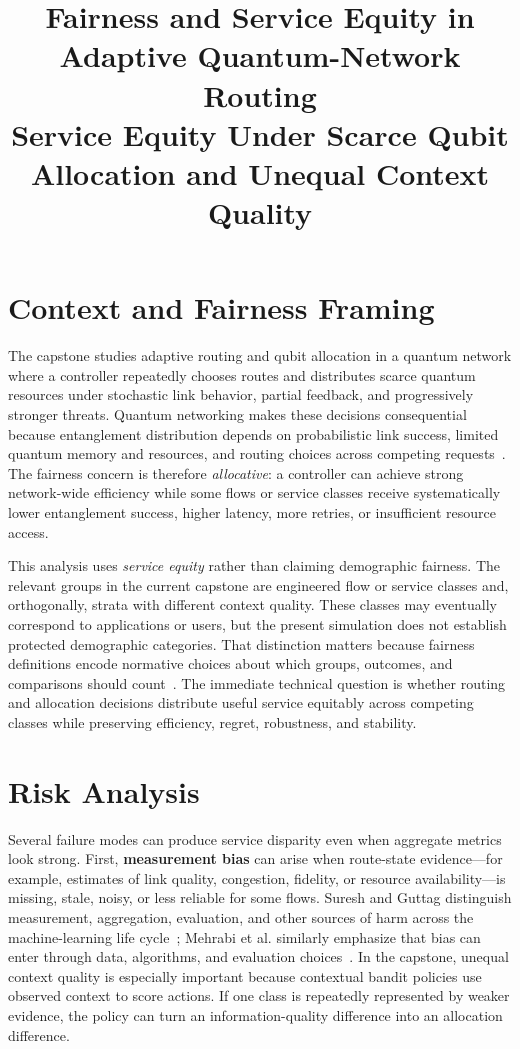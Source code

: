 \documentclass[conference]{IEEEtran}
\title{\textbf{Fairness and Service Equity in Adaptive Quantum-Network Routing}\\
\large Service Equity Under Scarce Qubit Allocation and Unequal Context Quality}
\author{\IEEEauthorblockN{Piter Z. Garcia Bautista}
\IEEEauthorblockA{DSCI 602 -- Applied Data Science II, Rochester Institute of Technology\\
Capstone: \textit{Fairness-Aware Adaptive Routing for Quantum Networks}\\
Primary Focus Area: \textbf{Fairness}}}
\begin{document}
\maketitle

\section{Context and Fairness Framing}

The capstone studies adaptive routing and qubit allocation in a quantum network where a controller repeatedly chooses routes and distributes scarce quantum resources under stochastic link behavior, partial feedback, and progressively stronger threats. Quantum networking makes these decisions consequential because entanglement distribution depends on probabilistic link success, limited quantum memory and resources, and routing choices across competing requests~\cite{wehner2018quantum,pant2019routing}. The fairness concern is therefore \emph{allocative}: a controller can achieve strong network-wide efficiency while some flows or service classes receive systematically lower entanglement success, higher latency, more retries, or insufficient resource access.

This analysis uses \emph{service equity} rather than claiming demographic fairness. The relevant groups in the current capstone are engineered flow or service classes and, orthogonally, strata with different context quality. These classes may eventually correspond to applications or users, but the present simulation does not establish protected demographic categories. That distinction matters because fairness definitions encode normative choices about which groups, outcomes, and comparisons should count~\cite{barocas2023fairness}. The immediate technical question is whether routing and allocation decisions distribute useful service equitably across competing classes while preserving efficiency, regret, robustness, and stability.

\section{Risk Analysis}

Several failure modes can produce service disparity even when aggregate metrics look strong. First, \textbf{measurement bias} can arise when route-state evidence---for example, estimates of link quality, congestion, fidelity, or resource availability---is missing, stale, noisy, or less reliable for some flows. Suresh and Guttag distinguish measurement, aggregation, evaluation, and other sources of harm across the machine-learning life cycle~\cite{suresh2021harm}; Mehrabi et al. similarly emphasize that bias can enter through data, algorithms, and evaluation choices~\cite{mehrabi2021survey}. In the capstone, unequal context quality is especially important because contextual bandit policies use observed context to score actions. If one class is repeatedly represented by weaker evidence, the policy can turn an information-quality difference into an allocation difference.
\end{document}
